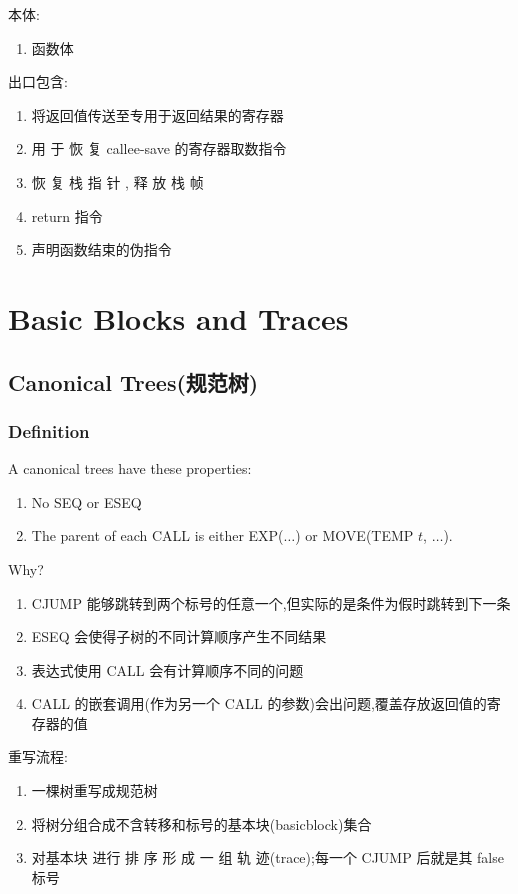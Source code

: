 本体:
\begin{enumerate}[start=6]
    \item 函数体
\end{enumerate}

出口包含:
\begin{enumerate}[start=7]
    \item 将返回值传送至专用于返回结果的寄存器 
    \item 用 于 恢 复 callee-save 的寄存器取数指令
    \item 恢 复 栈 指 针 , 释 放 栈 帧
    \item return 指令
    \item 声明函数结束的伪指令
\end{enumerate}


\newpage
\section{Basic Blocks and Traces}

\subsection{Canonical Trees(规范树)}
\subsubsection{Definition}
\begin{definition}
    A canonical trees have these properties:
    \begin{enumerate}
        \item No SEQ or ESEQ
        \item The parent of each CALL is either EXP($\dots$) or MOVE(TEMP $t$, $\dots$).
    \end{enumerate}
\end{definition}

Why?
\begin{enumerate}
    \item CJUMP 能够跳转到两个标号的任意一个,但实际的是条件为假时跳转到下一条
    \item ESEQ 会使得子树的不同计算顺序产生不同结果
    \item 表达式使用 CALL 会有计算顺序不同的问题
    \item CALL 的嵌套调用(作为另一个 CALL 的参数)会出问题,覆盖存放返回值的寄存器的值
\end{enumerate}


重写流程:
\begin{enumerate}
    \item 一棵树重写成规范树 
    \item 将树分组合成不含转移和标号的基本块(basicblock)集合 
    \item 对基本块 进行 排 序 形 成 一 组 轨 迹(trace);每一个 CJUMP 后就是其 false 标号
\end{enumerate}

